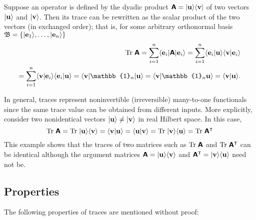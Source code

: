 Suppose an operator is defined by the dyadic product
$\textsf{\textbf{A}} =  \vert {\bf u} \rangle \langle {\bf v} \vert
$           of two vectors
$\vert {\bf u} \rangle$
and
$\vert {\bf v} \rangle$.
Then its trace can be rewritten as the scalar product of the two vectors (in exchanged order); that is,
for  some arbitrary orthonormal basis ${\frak B} =\{
 \vert {\bf e}_1\rangle ,
\ldots ,
 \vert {\bf e}_n\rangle
\}$
\begin{equation}
\begin{split}
\textrm{Tr}\;\textsf{\textbf{A}}
=\sum_{i=1}^n   \langle {\bf e}_i \vert \textsf{\textbf{A}} \vert {\bf e}_i \rangle
=\sum_{i=1}^n   \langle {\bf e}_i \vert {\bf u} \rangle \langle {\bf v} \vert   {\bf e}_i \rangle  \\
=\sum_{i=1}^n   \langle {\bf v} \vert   {\bf e}_i \rangle \langle {\bf e}_i \vert {\bf u} \rangle
=   \langle {\bf v} \vert   \mathbb{1}_n \vert {\bf u} \rangle
=   \langle {\bf v} \vert   \mathbb{1}_n  {\bf u} \rangle
=   \langle {\bf v} \vert  {\bf u} \rangle
.
\end{split}
\end{equation}

In general, traces represent noninvertible (irreversible) many-to-one functionals
since the same trace value can be obtained from different inputs.
More explicitly, consider two nonidentical vectors  $\vert {\bf u} \rangle \neq \vert {\bf v} \rangle$ in real Hilbert space.
In this case,
\begin{equation}
\textrm{Tr}\;\textsf{\textbf{A}} =
\textrm{Tr}\;\vert {\bf u} \rangle \langle {\bf v} \rangle =
\langle {\bf v} \vert  {\bf u} \rangle
=
\langle {\bf u} \vert  {\bf v} \rangle =
\textrm{Tr}\;\vert {\bf v} \rangle \langle {\bf u} \rangle =
\textrm{Tr}\;\textsf{\textbf{A}}^\intercal
\end{equation}
This example shows that the traces of two matrices such as $\textrm{Tr}\;\textsf{\textbf{A}}$ and $\textrm{Tr}\;\textsf{\textbf{A}}^\intercal $ can be identical although
the argument matrices  $\textsf{\textbf{A}}=\vert {\bf u} \rangle \langle {\bf v} \rangle
$ and $\textsf{\textbf{A}}^\intercal  = \vert {\bf v} \rangle \langle {\bf u} \rangle$ need not be.

\subsection{Properties}

The following properties of traces are mentioned without proof:


